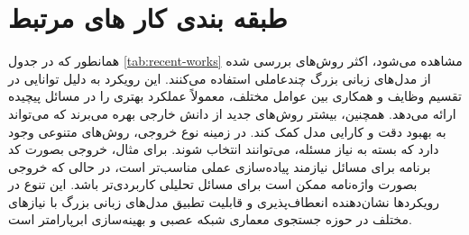 



\section{طبقه بندی کار های مرتبط}
همانطور که در جدول \ref{tab:recent-works} مشاهده می‌شود، اکثر روش‌های بررسی شده از مدل‌های زبانی بزرگ چندعاملی استفاده می‌کنند. این رویکرد به دلیل توانایی در تقسیم وظایف و همکاری بین عوامل مختلف، معمولاً عملکرد بهتری را در مسائل پیچیده ارائه می‌دهد. همچنین، بیشتر روش‌های جدید از دانش خارجی بهره می‌برند که می‌تواند به بهبود دقت و کارایی مدل کمک کند. در زمینه نوع خروجی، روش‌های متنوعی وجود دارد که بسته به نیاز مسئله، می‌توانند انتخاب شوند. برای مثال، خروجی بصورت کد برنامه برای مسائل نیازمند پیاده‌سازی عملی مناسب‌تر است، در حالی که خروجی بصورت واژه‌نامه ممکن است برای مسائل تحلیلی کاربردی‌تر باشد. این تنوع در رویکردها نشان‌دهنده انعطاف‌پذیری و قابلیت تطبیق مدل‌های زبانی بزرگ با نیازهای مختلف در حوزه جستجوی معماری شبکه عصبی و بهینه‌سازی ابرپارامتر است.

